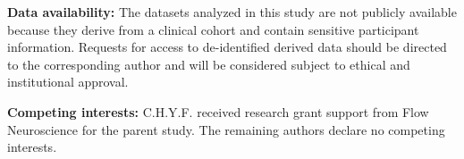\textbf{Data availability:} The datasets analyzed in this study are not publicly available because they derive from a clinical cohort and contain sensitive participant information. Requests for access to de-identified derived data should be directed to the corresponding author and will be considered subject to ethical and institutional approval.

\textbf{Competing interests:} C.H.Y.F. received research grant support from Flow Neuroscience for the parent study. The remaining authors declare no competing interests.
